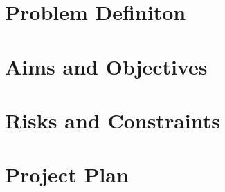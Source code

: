 \section{Problem Definiton}
\section{Aims and Objectives}
\section{Risks and Constraints}
\section{Project Plan}